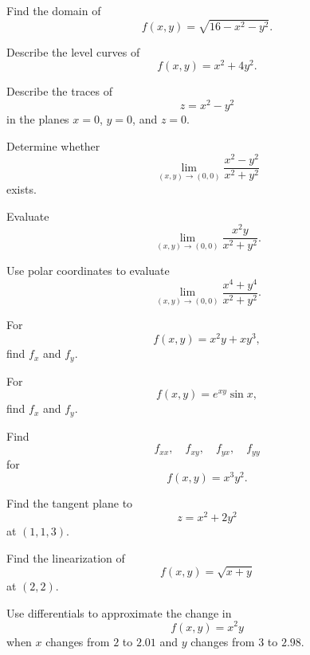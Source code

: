 \begin{exercise}[1]
Find the domain of
\[ f(x,y)=\sqrt{16-x^2-y^2}. \]
\end{exercise}

\begin{exercise}[1]
Describe the level curves of
\[ f(x,y)=x^2+4y^2. \]
\end{exercise}

\begin{exercise}[2]
Describe the traces of
\[ z=x^2-y^2 \]
in the planes \(x=0\), \(y=0\), and \(z=0\).
\end{exercise}

\begin{exercise}[2]
Determine whether
\[ \lim_{(x,y)\to(0,0)}
\frac{x^2-y^2}{x^2+y^2} \]
exists.
\end{exercise}

\begin{exercise}[2]
Evaluate
\[ \lim_{(x,y)\to(0,0)}
\frac{x^2y}{x^2+y^2}. \]
\end{exercise}

\begin{exercise}[2]
Use polar coordinates to evaluate
\[ \lim_{(x,y)\to(0,0)}
\frac{x^4+y^4}{x^2+y^2}. \]
\end{exercise}

\begin{exercise}[1]
For
\[ f(x,y)=x^2y+xy^3, \]
find \(f_x\) and \(f_y\).
\end{exercise}

\begin{exercise}[2]
For
\[ f(x,y)=e^{xy}\sin x, \]
find \(f_x\) and \(f_y\).
\end{exercise}

\begin{exercise}[2]
Find
\[ f_{xx},\quad f_{xy},\quad f_{yx},\quad f_{yy} \]
for
\[ f(x,y)=x^3y^2. \]
\end{exercise}

\begin{exercise}[2]
Find the tangent plane to
\[ z=x^2+2y^2 \]
at \((1,1,3)\).
\end{exercise}

\begin{exercise}[2]
Find the linearization of
\[ f(x,y)=\sqrt{x+y} \]
at \((2,2)\).
\end{exercise}

\begin{exercise}[2]
Use differentials to approximate the change in
\[ f(x,y)=x^2y \]
when \(x\) changes from \(2\) to \(2.01\) and \(y\) changes from \(3\) to
\(2.98\).
\end{exercise}

